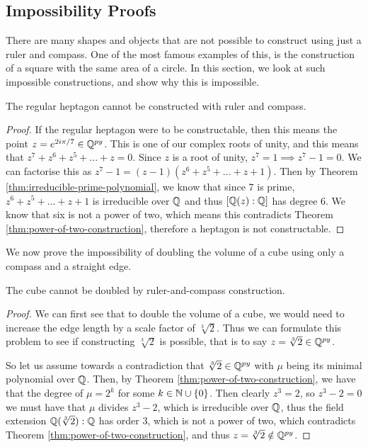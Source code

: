 \subsection{Impossibility Proofs}

There are many shapes and objects that are not possible to construct using just a ruler and compass. One of the most famous examples of this, is the construction of a square with the same area of a circle. In this section, we look at such impossible constructions, and show why this is impossible.

\begin{theorem}
    The regular heptagon cannot be constructed with ruler and compass.
\end{theorem}

\begin{proof}
    If the regular heptagon were to be constructable, then this means the point $z=e^{2i\pi/7} \in \mathbb Q^{py}$. This is one of our complex roots of unity, and this means that $z^7+z^6+z^5+...+z=0$. Since $z$ is a root of unity, $z^7=1 \implies z^7 - 1 = 0$. We can factorise this as $z^7-1=(z-1)(z^6+z^5+...+z+1)$. Then by Theorem \ref{thm:irreducible-prime-polynomial}, we know that since 7 is prime, $z^6+z^5+...+z+1$ is irreducible over $\mathbb Q$ and thus $[\mathbb Q(z):\mathbb Q]$ has degree 6. We know that six is not a power of two, which means this contradicts Theorem \ref{thm:power-of-two-construction}, therefore a heptagon is not constructable.
\end{proof}

We now prove the impossibility of doubling the volume of a cube using only a compass and a straight edge.

\begin{theorem}
    The cube cannot be doubled by ruler-and-compass construction.
\end{theorem}

\begin{proof}  
    We can first see that to double the volume of a cube, we would need to increase the edge length by a scale factor of $\sqrt[3]{2}$. Thus we can formulate this problem to see if constructing $\sqrt[3]{2}$ is possible, that is to say $z = \sqrt[3]{2} \in \mathbb Q^{py}$.

    So let us assume towards a contradiction that $\sqrt[3]{2} \in \mathbb Q^{py}$ with $\mu$ being its minimal polynomial over $\mathbb Q$. Then, by Theorem \ref{thm:power-of-two-construction}, we have that the degree of $\mu = 2^k$ for some $k\in \mathbb N \cup \{0\}$.
    Then clearly $z^3=2$, so $z^3-2=0$ we must have that $\mu$ divides $z^3-2$, which is irreducible over $\mathbb Q$, thus the field extension $\mathbb Q(\sqrt[3]{2}):\mathbb Q$ has order $3$, which is not a power of two, which contradicts Theorem \ref{thm:power-of-two-construction}, and thus $z = \sqrt[3]{2} \notin \mathbb Q^{py}$.
\end{proof}


